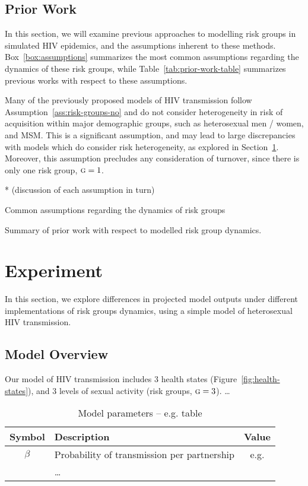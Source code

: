 \documentclass{article}
\numberwithin{equation}{section}
\newcommand{\G}{\textsc{g}}
\begin{document}
\subsection{Prior Work}
In this section, we will examine previous approaches to modelling
risk groups in simulated HIV epidemics,
and the assumptions inherent to these methods.
Box~\ref{box:assumptions} summarizes
the most common assumptions regarding the dynamics of these risk groups,
while Table~\ref{tab:prior-work-table} summarizes previous works
with respect to these assumptions.
\par
Many of the previously proposed models of HIV transmission
follow Assumption~\ref{ass:risk-groups-no} and do not consider heterogeneity
in risk of acquisition within major demographic groups,
such as heterosexual men / women, and MSM.
This is a significant assumption,
and may lead to large discrepancies with models which do consider risk heterogeneity,
as explored in Section~\ref{s:exp}.
Moreover, this assumption precludes any consideration of turnover,
since there is only one risk group, $\G = 1$.
\par
* (discussion of each assumption in turn)
\begin{floatbox}
  \caption{Common assumptions regarding the dynamics of risk groups}
  \label{box:assumptions}
  
\end{floatbox}
\begin{table}
  \centering
  \caption{Summary of prior work with respect to modelled risk group dynamics.}
  \label{tab:prior-work-table}
  
\end{table}
\section{Experiment}\label{s:exp}
In this section, we explore differences in projected model outputs
under different implementations of risk groups dynamics,
using a simple model of heterosexual HIV transmission.
\subsection{Model Overview}
Our model of HIV transmission includes 3 health states (Figure~\ref{fig:health-states}),
and 3 levels of sexual activity (risk groups, $\G = 3$).
\dots
\begin{table}
  \centering\caption{Model parameters -- e.g. table}
  \begin{tabular}{clc}
  	\toprule
  	Symbol  & Description                                 & Value \\
  	\midrule
  	$\beta$ & Probability of transmission per partnership & e.g.  \\
  	        & \dots                                       &       \\
  	\bottomrule
  \end{tabular}
\end{table}
\end{document}
